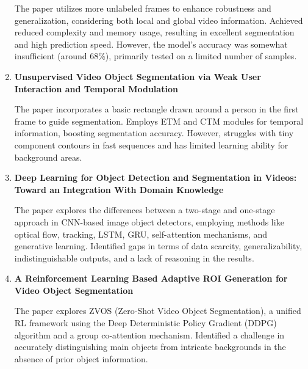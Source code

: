 \begin{enumerate}
The paper utilizes more unlabeled frames to enhance robustness and generalization, considering both local and global video information. Achieved reduced complexity and memory usage, resulting in excellent segmentation and high prediction speed. However, the model's accuracy was somewhat insufficient (around 68\%), primarily tested on a limited number of samples.\\


\item\textbf{Unsupervised Video Object Segmentation via Weak User Interaction and Temporal Modulation}\cite{10}

The paper incorporates a basic rectangle drawn around a person in the first frame to guide segmentation. Employs ETM and CTM modules for temporal information, boosting segmentation accuracy. However, struggles with tiny component contours in fast sequences and has limited learning ability for background areas.\\


\clearpage

\item \textbf{Deep Learning for Object Detection and Segmentation in Videos: Toward an Integration With Domain Knowledge}\cite{11}

The paper explores the differences between a two-stage and one-stage approach in CNN-based image object detectors, employing methods like optical flow, tracking, LSTM, GRU, self-attention mechanisms, and generative learning. Identified gaps in terms of data scarcity, generalizability, indistinguishable outputs, and a lack of reasoning in the results. 
\\


 \item \textbf{A Reinforcement Learning Based Adaptive ROI Generation for Video Object Segmentation}\cite{12}

The paper explores ZVOS (Zero-Shot Video Object Segmentation), a unified RL framework using the Deep Deterministic Policy Gradient (DDPG) algorithm and a group co-attention mechanism. Identified a challenge in accurately distinguishing main objects from intricate backgrounds in the absence of prior object information.\\ 


\end{enumerate}
